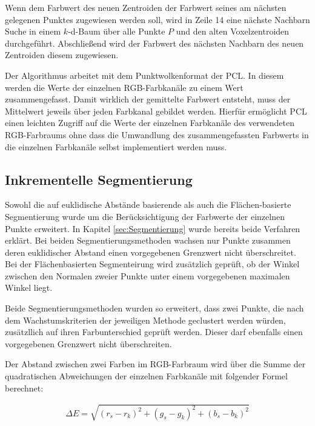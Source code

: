 Wenn dem Farbwert des neuen Zentroiden der Farbwert seines am nächsten gelegenen Punktes zugewiesen werden soll, wird in Zeile 14 eine nächste Nachbarn Suche in einem $k$-d-Baum über alle Punkte $P$ und den alten Voxelzentroiden durchgeführt. Abschließend wird der Farbwert des nächsten Nachbarn des neuen Zentroiden diesem zugewiesen. 

Der Algorithmus arbeitet mit dem Punktwolkenformat der PCL. In diesem werden die Werte der einzelnen RGB-Farbkanäle zu einem Wert zusammengefasst. Damit wirklich der gemittelte Farbwert entsteht, muss der Mittelwert jeweils über jeden Farb\-ka\-nal gebildet werden. Hierfür ermöglicht PCL einen leichten Zugriff auf die Werte der einzelnen Farbkanäle des verwendeten RGB-Farbraums ohne dass die Umwandlung des zusammengefassten Farbwerts in die einzelnen Farbkanäle selbst implementiert werden muss.  

\subsection[Inkrementelle Segmentierung (Schmelzer)]{Inkrementelle Segmentierung}

Sowohl die auf euklidische Abstände basierende als auch die Flächen-basierte Segmentierung wurde um die Berücksichtigung der Farbwerte der einzelnen Punkte erweitert. In Kapitel \ref{sec:Segmentierung} wurde bereits beide Verfahren erklärt. Bei beiden Seg\-men\-tie\-rungs\-me\-tho\-den wachsen nur Punkte zusammen deren euklidischer Abstand einen vorgegebenen Grenzwert nicht überschreitet. Bei der Flächenbasierten Segmenteirung wird zusätzlich geprüft, ob der Winkel zwischen den Normalen zweier Punkte unter einem vorgegebenen maximalen Winkel liegt. 

Beide Segmentierungsmethoden wurden so erweitert, dass zwei Punkte, die nach dem Wachstumskriterien der jeweiligen Methode geclustert werden würden, zusätzllich auf ihren Farbunterschied geprüft werden. Dieser darf ebenfalls einen vorgegebenen Grenzwert nicht überschreiten. 

Der Abstand zwischen zwei Farben im RGB-Farbraum wird über die Summe der quadratischen Abweichungen der einzelnen Farbkanäle mit folgender Formel berechnet:  

\begin{align}
\label{equ:Farbdifferenz}
	\Delta E = \sqrt{(r_s-r_k)^2+(g_s-g_k)^2+(b_s-b_k)^2}
\end{align}

